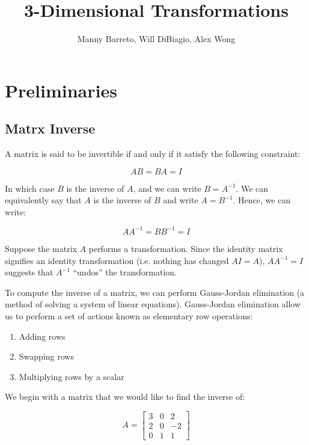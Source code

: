 \documentclass[12pt,letterpaper]{article}
\title{3-Dimensional Transformations}
\author{Manny Barreto, Will DiBiagio, Alex Wong}
\date{}
\begin{document}
\maketitle

\section{Preliminaries}
\subsection{Matrx Inverse}
A matrix is said to be invertible if and only if it satisfy the following constraint:

\begin{equation}
   AB = BA = I
\end{equation}

In which case $B$ is the inverse of $A$, and we can write $B = A^{-1}$. We can equivalently say that $A$ is the inverse of $B$ and write $A = B^{-1}$. Hence, we can write:

\begin{equation}
   AA^{-1} = BB^{-1} = I
\end{equation}

Suppose the matrix $A$ performs a transformation. Since the identity matrix signifies an identity transformation (i.e. nothing has changed $AI = A$), $AA^{-1} = I$ suggests that $A^{-1}$ ``undos'' the transformation.

To compute the inverse of a matrix, we can perform Gauss-Jordan elimination (a method of solving a system of linear equations). Gauss-Jordan elimination allow us to perform a set of actions known as elementary row operations:
\begin{enumerate}
    \item Adding rows
    \item Swapping rows
    \item Multiplying rows by a scalar
\end{enumerate}

\newpage

We begin with a matrix that we would like to find the inverse of:

\begin{equation}
    A = \begin{bmatrix}
        3 & 0 &  2 \\
        2 & 0 & -2 \\
        0 & 1 & 1
        \end{bmatrix}
\end{equation}
\end{document}
